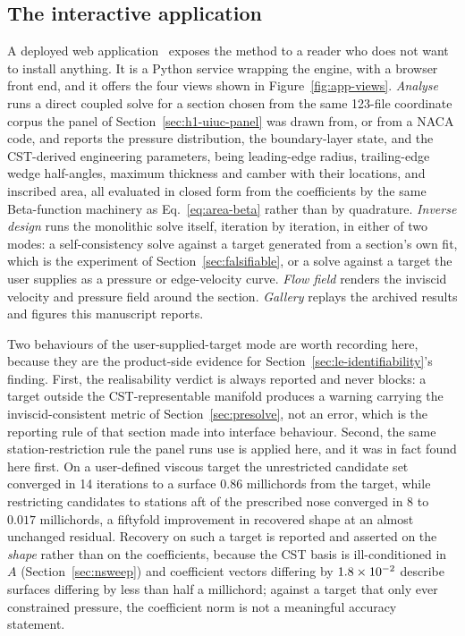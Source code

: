 \subsection{The interactive application}

A deployed web application~\citep{cinsapp} exposes the method to a reader who
does not want to install anything. It is a Python service wrapping the engine,
with a browser front end, and it offers the four views shown in
Figure~\ref{fig:app-views}. \emph{Analyse} runs a direct
coupled solve for a section chosen from the same 123-file coordinate corpus
the panel of Section~\ref{sec:h1-uiuc-panel} was drawn from, or from a NACA
code, and reports the pressure distribution, the boundary-layer state, and the
CST-derived engineering parameters, being leading-edge radius, trailing-edge
wedge half-angles, maximum thickness and camber with their locations, and
inscribed area, all evaluated in closed form from the coefficients by the same
Beta-function machinery as Eq.~\eqref{eq:area-beta} rather than by quadrature.
\emph{Inverse design} runs the monolithic solve itself, iteration by
iteration, in either of two modes: a self-consistency solve against a target
generated from a section's own fit, which is the experiment of
Section~\ref{sec:falsifiable}, or a solve against a target the user supplies
as a pressure or edge-velocity curve. \emph{Flow field} renders the inviscid
velocity and pressure field around the section. \emph{Gallery} replays the
archived results and figures this manuscript reports.

Two behaviours of the user-supplied-target mode are worth recording here,
because they are the product-side evidence for
Section~\ref{sec:le-identifiability}'s finding. First, the realisability
verdict is always reported and never blocks: a target outside the
CST-representable manifold produces a warning carrying the
inviscid-consistent metric of Section~\ref{sec:presolve}, not an error, which
is the reporting rule of that section made into interface behaviour. Second,
the same station-restriction rule the panel runs use is applied here, and it
was in fact found here first. On a user-defined viscous target the
unrestricted candidate set converged in 14 iterations to a surface $0.86$
millichords from the target, while restricting candidates to stations aft of
the prescribed nose converged in 8 to $0.017$ millichords, a fiftyfold
improvement in recovered shape at an almost unchanged residual. Recovery on
such a target is reported and asserted on the \emph{shape} rather than on the
coefficients, because the CST basis is ill-conditioned in $A$
(Section~\ref{sec:nsweep}) and coefficient vectors differing by
$1.8\times10^{-2}$ describe surfaces differing by less than half a millichord;
against a target that only ever constrained pressure, the coefficient norm is
not a meaningful accuracy statement.

